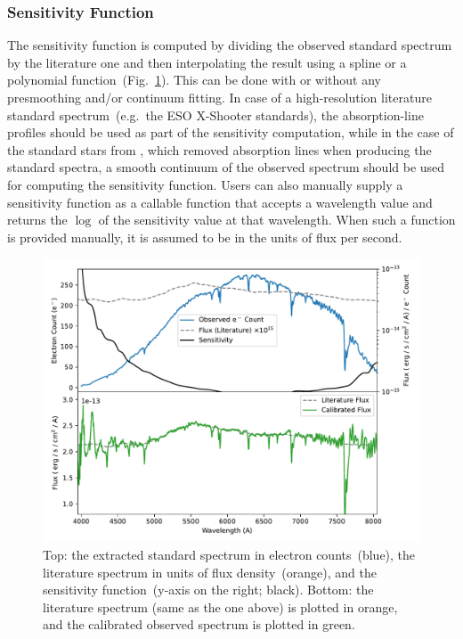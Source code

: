 \documentclass[linenumbers, twocolumn]{aastex631}
\begin{document}
\subsubsection*{Sensitivity Function}
The sensitivity function is computed by dividing the observed standard spectrum
by the literature one and then interpolating the result using a spline or a
polynomial function~(Fig.~\ref{fig:fluxcal}). This can be done with or without
any presmoothing and/or continuum fitting. In case of a high-resolution
literature standard spectrum~(e.g.\ the ESO X-Shooter standards), the
absorption-line profiles should be used as part of the sensitivity computation,
while in the case of the standard stars from \citet{1990AJ.....99.1621O},
which removed absorption lines when producing the standard spectra, a
smooth continuum of the observed spectrum should be used for computing
the sensitivity function. Users can also manually supply a sensitivity function
as a callable function that accepts a wavelength value and returns the $\log$
of the sensitivity value at that wavelength. When such a function is provided
manually, it is assumed to be in the units of flux per second.

\begin{figure}
    \centering
    \includegraphics[width=\columnwidth]{fig_06_flux_calibration_diagnostics.pdf}
    \caption{Top: the extracted standard spectrum in electron
    counts~(blue), the literature spectrum in units of flux density~(orange),
    and the sensitivity function~(y-axis on the right; black). Bottom:
    the literature spectrum (same as the one above) is plotted in orange, and
    the calibrated observed spectrum is plotted in green.}
    \label{fig:fluxcal}
\end{figure}
\end{document}
